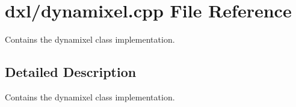 \hypertarget{a00013}{}\section{dxl/dynamixel.cpp File Reference}
\label{a00013}


Contains the dynamixel class implementation.  




\subsection{Detailed Description}
Contains the dynamixel class implementation. 

